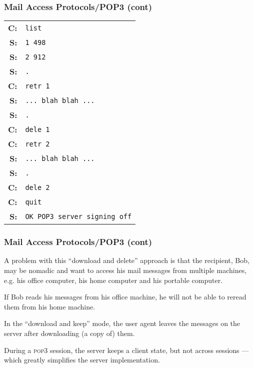 %
\begin{frame}[containsverbatim]
\frametitle{Mail Access Protocols/POP3 (cont)}

{\small
\renewcommand\arraystretch{0.8}
\begin{tabular}{rl}
\textbf{C:} & \verb+list+\\
\textbf{S:} & \verb+1 498+\\
\textbf{S:} & \verb+2 912+\\
\textbf{S:} & \verb+.+\\
\textbf{C:} & \verb+retr 1+\\
\textbf{S:} & \verb+... blah blah ...+\\
\textbf{S:} & \verb+.+\\
\textbf{C:} & \verb+dele 1+\\
\textbf{C:} & \verb+retr 2+\\
\textbf{S:} & \verb+... blah blah ...+\\
\textbf{S:} & \verb+.+\\
\textbf{C:} & \verb+dele 2+\\
\textbf{C:} & \verb+quit+\\
\textbf{S:} & \verb+OK POP3 server signing off+
\end{tabular}
}

\end{frame}

%
\begin{frame}
\frametitle{Mail Access Protocols/POP3 (cont)}

A problem with this ``download and delete'' approach is that the
recipient, Bob, may be nomadic and want to access his mail messages
from multiple machines, e.g. his office computer, his home computer
and his portable computer.

If Bob reads his messages from his office machine, he will not be able
to reread them from his home machine. 

In the ``download and keep'' mode, the user agent leaves the messages
on the server after downloading (a copy of) them.

During a \textsc{pop3} session, the server keeps a client state, but
not across sessions --- which greatly simplifies the server
implementation.

\end{frame}

